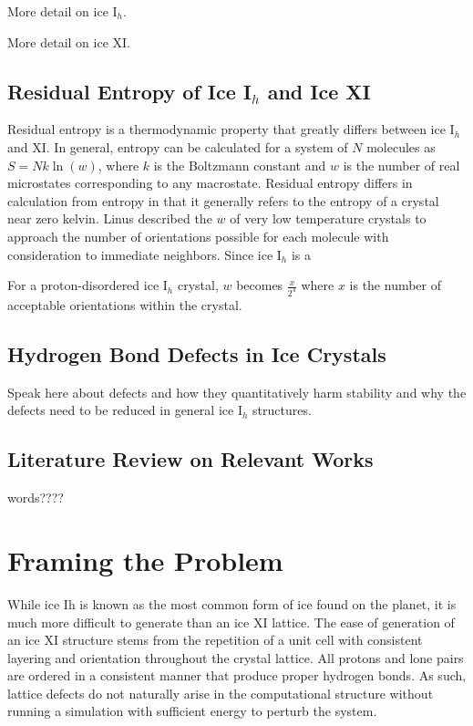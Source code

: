 More detail on ice I$_{h}$.

More detail on ice XI.

\subsection{Residual Entropy of Ice I$_{h}$ and Ice XI}

Residual entropy is a thermodynamic property that greatly differs between ice I$_{h}$ and XI. 
In general, entropy can be calculated for a system of $N$ molecules as $S = Nk\ln(w)$, where $k$ is the Boltzmann constant and $w$ is the number of real microstates corresponding to any macrostate.
Residual entropy differs in calculation from entropy in that it generally refers to the entropy of a crystal near zero kelvin. 
Linus \cite{PaulingIce} described the $w$ of very low temperature crystals to approach the number of orientations possible for each molecule with consideration to immediate neighbors. 
Since ice I$_{h}$ is a 

For a proton-disordered ice I$_{h}$ crystal, $w$ becomes $\frac{x}{2^{4}}$ where $x$ is the number of acceptable orientations within the crystal.

\subsection{Hydrogen Bond Defects in Ice Crystals}

Speak here about defects and how they quantitatively harm stability and why the defects need to be reduced in general ice I$_{h}$ structures.

\subsection{Literature Review on Relevant Works}

words????


\section{Framing the Problem}
While ice Ih is known as the most common form of ice found on the planet, it is much more difficult to generate than an ice XI lattice. 
The ease of generation of an ice XI structure stems from the repetition of a unit cell with consistent layering and orientation throughout the crystal lattice. 
All protons and lone pairs are ordered in a consistent manner that produce proper hydrogen bonds. 
As such, lattice defects do not naturally arise in the computational structure without running a simulation with sufficient energy to perturb the system.

